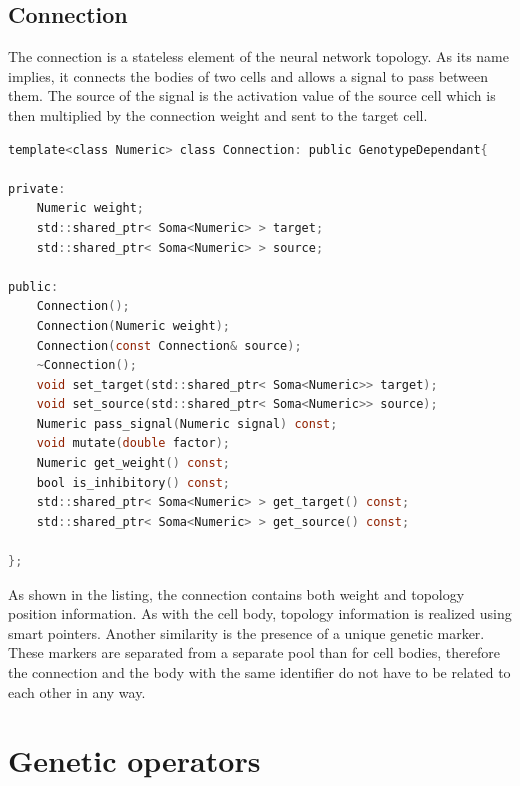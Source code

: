 \FloatBarrier
\subsection{Connection}
The connection is a stateless element of the neural network topology. 
As its name implies, it connects the bodies of two cells and allows a signal to pass between them. 
The source of the signal is the activation value of the source cell which is then multiplied by 
the connection weight and sent to the target cell.
\begin{lstlisting}[language=C]
template<class Numeric> class Connection: public GenotypeDependant{

private:
	Numeric weight;
	std::shared_ptr< Soma<Numeric> > target;
	std::shared_ptr< Soma<Numeric> > source;

public:
	Connection();
	Connection(Numeric weight);
	Connection(const Connection& source);
	~Connection();
	void set_target(std::shared_ptr< Soma<Numeric>> target);
	void set_source(std::shared_ptr< Soma<Numeric>> source);
	Numeric pass_signal(Numeric signal) const;
	void mutate(double factor);
	Numeric get_weight() const;
	bool is_inhibitory() const;
	std::shared_ptr< Soma<Numeric> > get_target() const;
	std::shared_ptr< Soma<Numeric> > get_source() const;

};
\end{lstlisting}


As shown in the listing, the connection contains both weight and topology position information.
As with the cell body, topology information is realized using smart pointers. 
Another similarity is the presence of a unique genetic marker. These markers are separated from 
a separate pool than for cell bodies, therefore the connection and the body with the same 
identifier do not have to be related to each other in any way.


\FloatBarrier
\section{Genetic operators}


\FloatBarrier
